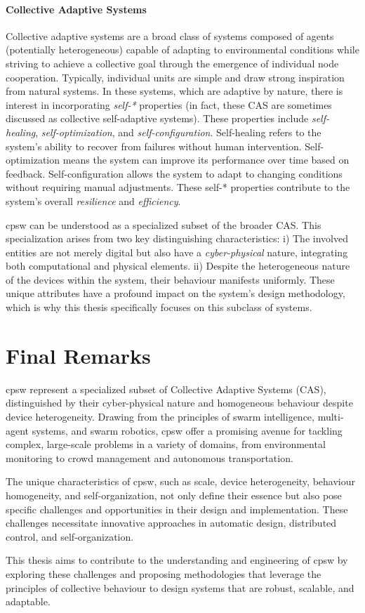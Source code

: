 \paragraph*{Collective Adaptive Systems}
Collective adaptive systems are a broad class of systems composed of agents 
 (potentially heterogeneous) capable of adapting to environmental conditions 
 while striving to achieve a collective goal through the emergence of individual node cooperation. 
%
Typically, individual units are simple and draw strong inspiration from natural systems. 
 In these systems, which are adaptive by nature, 
 there is interest in incorporating \emph{self-*} properties (in fact, these CAS are sometimes discussed as collective self-adaptive systems). 
%
These properties include \emph{self-healing}, \emph{self-optimization}, and \emph{self-configuration}. 
Self-healing refers to the system's ability to recover from failures without human intervention. 
Self-optimization means the system can improve its performance over time based on feedback. Self-configuration allows the system to adapt to changing conditions without requiring manual adjustments. 
These self-* properties contribute to the system's overall \emph{resilience} and \emph{efficiency}.

\ac{cpsw} can be understood as a specialized subset of the broader CAS.
This specialization arises from two key distinguishing characteristics:
i) The involved entities are not merely digital but also have a \emph{cyber-physical} nature,
 integrating both computational and physical elements.
ii) Despite the heterogeneous nature of the devices within the system, 
 their behaviour manifests uniformly.
These unique attributes have a profound impact on the system's design methodology, 
 which is why this thesis specifically focuses on this subclass of systems.
%

\section{Final Remarks}
\Acf{cpsw} represent a specialized subset of Collective Adaptive Systems (CAS), distinguished by their cyber-physical nature and homogeneous behaviour despite device heterogeneity. 
 Drawing from the principles of swarm intelligence, multi-agent systems, and swarm robotics, 
 \ac{cpsw} offer a promising avenue for tackling complex, large-scale problems in a variety of domains, from environmental monitoring to crowd management and autonomous transportation.

The unique characteristics of \ac{cpsw}, such as scale, 
device heterogeneity, behaviour homogeneity, and self-organization, not only define their essence but also pose specific challenges and opportunities in their design and implementation. 
These challenges necessitate innovative approaches in automatic design,
 distributed control, and self-organization.

This thesis aims to contribute to the understanding and engineering of \ac{cpsw} by exploring these challenges and proposing methodologies that leverage the principles of collective behaviour to design systems that are robust, scalable, and adaptable. 
